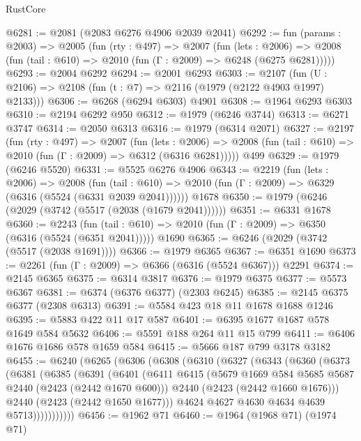 \begin{lexlean}{RustCore}
\begin{coremodule}
@6281 := @2081 (@2083 @6276 @4906 @2039 @2041)
@6292 := fun (params : @2003) =>
  @2005
    (fun (rty : @497) =>
    @2007
      (fun (lets : @2006) =>
      @2008 (fun (tail : @610) => @2010 (fun (Γ : @2009) => @6248 (@6275 @6281)))))
@6293 := @2004 @6292
@6294 := @2001 @6293
@6303 := @2107 (fun (U : @2106) => @2108 (fun (t : @7) => @2116 (@1979 (@2122 @4903 @1997) @2133)))
@6306 := @6268 (@6294 @6303) @4901
@6308 := @1964 @6293 @6303
@6310 := @2194 @6292 @950
@6312 := @1979 (@6246 @3744)
@6313 := @6271 @3747
@6314 := @2050 @6313
@6316 := @1979 (@6314 @2071)
@6327 := @2197
    (fun (rty : @497) =>
    @2007
      (fun (lets : @2006) =>
      @2008 (fun (tail : @610) => @2010 (fun (Γ : @2009) => @6312 (@6316 @6281)))))
    @499
@6329 := @1979 (@6246 @5520)
@6331 := @5525 @6276 @4906
@6343 := @2219
    (fun (lets : @2006) =>
    @2008
      (fun (tail : @610) => @2010 (fun (Γ : @2009) => @6329 (@6316 (@5524 (@6331 @2039 @2041))))))
    @1678
@6350 := @1979 (@6246 (@2029 (@3742 (@5517 (@2038 (@1679 @2041))))))
@6351 := @6331 @1678
@6360 := @2243
    (fun (tail : @610) => @2010 (fun (Γ : @2009) => @6350 (@6316 (@5524 (@6351 @2041)))))
    @1690
@6365 := @6246 (@2029 (@3742 (@5517 (@2038 @1691))))
@6366 := @1979 @6365
@6367 := @6351 @1690
@6373 := @2261 (fun (Γ : @2009) => @6366 (@6316 (@5524 @6367))) @2291
@6374 := @2145 @6365
@6375 := @6314 @3817
@6376 := @1979 @6375
@6377 := @5573 @6367
@6381 := @6374 (@6376 @6377) (@2303 @6245)
@6385 := @2145 @6375 @6377 (@2308 @6313)
@6391 := @5584 @423 @18 @11 @1678 @1688 @1246
@6395 := @5883 @422 @11 @17 @587
@6401 := @6395 @1677 @1687 @578 @1649 @584 @5632
@6406 := @5591 @188 @264 @11 @15 @799
@6411 := @6406 @1676 @1686 @578 @1659 @584
@6415 := @5666 @187 @799 @3178 @3182
@6455 := @6240
    (@6265
      (@6306
        (@6308
          (@6310
            (@6327
              (@6343
                (@6360
                  (@6373
                    (@6381
                      (@6385
                        (@6391
                          (@6401
                            (@6411
                              @6415
                              (@5679 @1669 @584 @5685 @5687 @2440 (@2423 (@2442 @1670 @600)))
                              @2440
                              (@2423 (@2442 @1660 @1676)))
                            @2440
                            (@2423 (@2442 @1650 @1677)))
                          @4624
                          @4627
                          @4630
                          @4634
                          @4639
                          @5713)))))))))))
@6456 := @1962 @71
@6460 := @1964 (@1968 @71) (@1974 @71)

\end{coremodule}
\end{lexlean}
